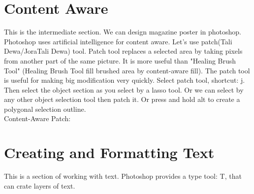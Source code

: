 \documentclass[11 pt]{article}
\begin{document}
\section{Content Aware}
This is the intermediate section. We can design magazine poster in photoshop. Photoshop uses artificial intelligence for content aware. Let's use patch(Tali Dewa/JoraTali Dewa) tool. Patch tool replaces a selected area by taking pixels from another part of the same picture. It is more useful than "Healing Brush Tool" (Healing Brush Tool fill brushed area by content-aware fill). The patch tool is useful for making big modification very quickly. Select patch tool, shortcut: j. Then select the object section as you select by a lasso tool. Or we can select by any other object selection tool then patch it. Or press and hold alt to create a polygonal selection outline. \\
Content-Aware Patch:

\section{Creating and Formatting Text}
This is a section of working with text. Photoshop provides a type tool: T, that can crate layers of text.
\end{document}
